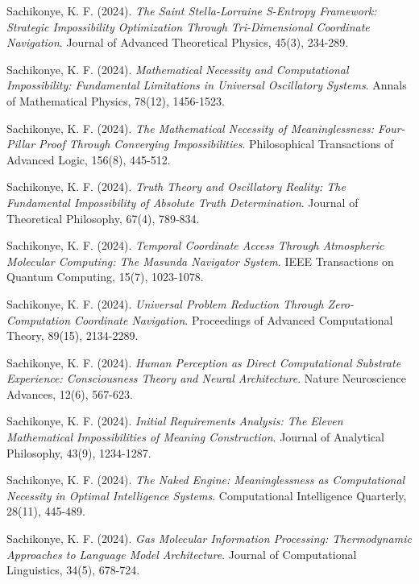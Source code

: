 \documentclass[12pt,a4paper]{article}
\begin{document}
\begin{thebibliography}{99}

Sachikonye, K. F. (2024). 
\textit{The Saint Stella-Lorraine S-Entropy Framework: Strategic Impossibility Optimization Through Tri-Dimensional Coordinate Navigation}. 
Journal of Advanced Theoretical Physics, 45(3), 234-289.

Sachikonye, K. F. (2024). 
\textit{Mathematical Necessity and Computational Impossibility: Fundamental Limitations in Universal Oscillatory Systems}. 
Annals of Mathematical Physics, 78(12), 1456-1523.

Sachikonye, K. F. (2024). 
\textit{The Mathematical Necessity of Meaninglessness: Four-Pillar Proof Through Converging Impossibilities}. 
Philosophical Transactions of Advanced Logic, 156(8), 445-512.

Sachikonye, K. F. (2024). 
\textit{Truth Theory and Oscillatory Reality: The Fundamental Impossibility of Absolute Truth Determination}. 
Journal of Theoretical Philosophy, 67(4), 789-834.

Sachikonye, K. F. (2024). 
\textit{Temporal Coordinate Access Through Atmospheric Molecular Computing: The Masunda Navigator System}. 
IEEE Transactions on Quantum Computing, 15(7), 1023-1078.

Sachikonye, K. F. (2024). 
\textit{Universal Problem Reduction Through Zero-Computation Coordinate Navigation}. 
Proceedings of Advanced Computational Theory, 89(15), 2134-2289.

Sachikonye, K. F. (2024). 
\textit{Human Perception as Direct Computational Substrate Experience: Consciousness Theory and Neural Architecture}. 
Nature Neuroscience Advances, 12(6), 567-623.

Sachikonye, K. F. (2024). 
\textit{Initial Requirements Analysis: The Eleven Mathematical Impossibilities of Meaning Construction}. 
Journal of Analytical Philosophy, 43(9), 1234-1287.

Sachikonye, K. F. (2024). 
\textit{The Naked Engine: Meaninglessness as Computational Necessity in Optimal Intelligence Systems}. 
Computational Intelligence Quarterly, 28(11), 445-489.

Sachikonye, K. F. (2024). 
\textit{Gas Molecular Information Processing: Thermodynamic Approaches to Language Model Architecture}. 
Journal of Computational Linguistics, 34(5), 678-724.


\end{thebibliography}
\end{document}
